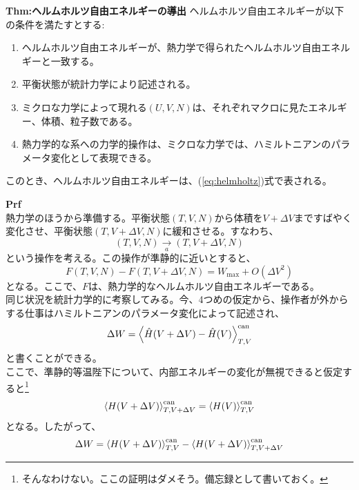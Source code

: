 \documentclass[a4paper,11pt]{jsarticle}
\numberwithin{equation}{section}
\begin{document}
\begin{itembox}[l]{\textbf{Thm:ヘルムホルツ自由エネルギーの導出}}
  ヘルムホルツ自由エネルギーが以下の条件を満たすとする:
  \begin{enumerate}
    \item ヘルムホルツ自由エネルギーが、熱力学で得られたヘルムホルツ自由エネルギーと一致する。
    \item 平衡状態が統計力学により記述される。
    \item ミクロな力学によって現れる$(U,V,N)$は、それぞれマクロに見たエネルギー、体積、粒子数である。
    \item 熱力学的な系への力学的操作は、ミクロな力学では、ハミルトニアンのパラメータ変化として表現できる。
  \end{enumerate}
  このとき、ヘルムホルツ自由エネルギーは、(\ref{eq:helmholtz})式で表される。

\end{itembox}
\textbf{Prf}\\
熱力学のほうから準備する。平衡状態$(T,V,N)$から体積を$V+\Delta V$まですばやく変化させ、平衡状態$(T,V+\Delta V,N)$に緩和させる。すなわち、
\begin{equation}
  (T,V,N) \underset{a}{\rightarrow} (T,V+\Delta V,N)
\end{equation}
という操作を考える。この操作が準静的に近いとすると、
\begin{equation}
  F(T,V,N) - F(T,V+\Delta V,N) = W_{\text{max}} + O(\Delta V^2)
\end{equation}
となる。ここで、$F$は、熱力学的なヘルムホルツ自由エネルギーである。\\
同じ状況を統計力学的に考察してみる。今、4つめの仮定から、操作者が外からする仕事はハミルトニアンのパラメータ変化によって記述され、
\begin{equation}
  \Delta W = \expval{\hat{H}(V+\Delta V)-\hat{H}(V)}_{T,V}^{\text{can}}
\end{equation}
と書くことができる。\\
ここで、準静的等温陛下について、内部エネルギーの変化が無視できると仮定すると\footnote{そんなわけない。ここの証明はダメそう。備忘録として書いておく。}
\begin{equation}
  \ev{H(V+\Delta V)}_{T,V+\Delta V}^{\text{can}} = \ev{H(V)}_{T,V}^{\text{can}}
\end{equation}
となる。したがって、
\begin{equation}
  \Delta W = \ev{H(V+\Delta V)}_{T,V}^{\text{can}} - \ev{H(V+\Delta V)}_{T,V+\Delta V}^{\text{can}}
\end{equation}
\end{document}
